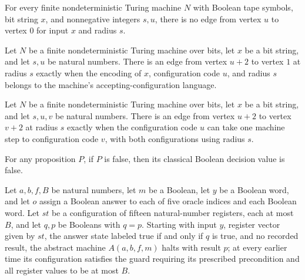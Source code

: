 \begin{lemma}
\label{Complexity.PathHard.not_edge_to_zero}
\leanok
{}
For every finite nondeterministic Turing machine $N$ with Boolean tape symbols, bit
string $x$, and nonnegative integers $s,u$, there is no edge from vertex $u$ to vertex
$0$ for input $x$ and radius $s$.
\end{lemma}

\begin{lemma}
\label{Complexity.PathHard.edge_to_one_iff}
\leanok
{}
Let $N$ be a finite nondeterministic Turing machine over bits, let $x$ be a bit string,
and let $s,u$ be natural numbers. There is an edge from vertex $u+2$ to vertex $1$ at
radius $s$ exactly when the encoding of $x$, configuration code $u$, and radius $s$
belongs to the machine's accepting-configuration language.
\end{lemma}

\begin{lemma}
\label{Complexity.PathHard.edge_codes_iff}
\leanok
{}
Let $N$ be a finite nondeterministic Turing machine over bits, let $x$ be a bit string,
and let $s,u,v$ be natural numbers. There is an edge from vertex $u+2$ to vertex $v+2$
at radius $s$ exactly when the configuration code $u$ can take one machine step to
configuration code $v$, with both configurations using radius $s$.
\end{lemma}

\begin{lemma}
\label{Complexity.PathHard.cdec_false}
\leanok
{}
For any proposition $P$, if $P$ is false, then its classical Boolean decision value is
false.
\end{lemma}

\begin{lemma}
\label{Complexity.PathHard.ans_dec}
\leanok
{}
Let $a,b,f,B$ be natural numbers, let $m$ be a Boolean, let $y$ be a Boolean word, and
let $o$ assign a Boolean answer to each of five oracle indices and each Boolean word.
Let $st$ be a configuration of fifteen natural-number registers, each at most $B$, and
let $q,p$ be Booleans with $q=p$. Starting with input $y$, register vector given by
$st$, the answer state labeled true if and only if $q$ is true, and no recorded result,
the abstract machine $A(a,b,f,m)$ halts with result $p$; at every earlier time its
configuration satisfies the guard requiring its prescribed precondition and all register
values to be at most $B$.
\end{lemma}

